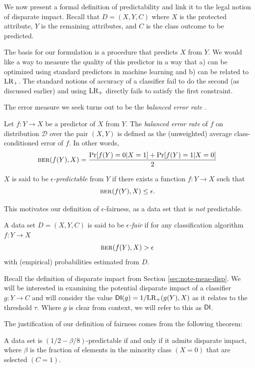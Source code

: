 We now present a formal definition of predictability and link it to the legal notion of disparate impact.  Recall that $D = (X,Y,C)$ where $X$ is the protected attribute, $Y$ is the remaining attributes, and $C$ is the class outcome to be predicted.

The basis for our formulation is a procedure that predicts $X$ from $Y$. We would like a way to measure the quality of this predictor in a way that a) can be optimized using standard predictors in machine learning and b) can be related to $\text{LR}_+$. The standard notions of accuracy of a classifier fail to do the second (as discussed earlier) and using $\text{LR}_+$ directly fails to satisfy the first constraint. 

The error measure we seek turns out to be the \emph{balanced error rate} \ber. 

\begin{defn}[BER]
  Let $f : Y \to X$ be a predictor of $X$ from $Y$. The \emph{balanced error rate} \ber of $f$ on distribution $\mathcal{D}$ over the pair $(X, Y)$ is defined as the (unweighted) average class-conditioned error of $f$. In other words, 
\[ \text{\textsc{ber}}(f(Y), X) = \frac{\Pr[f(Y) = 0 | X = 1] + \Pr[f(Y) = 1 | X = 0] }{2} \]
\end{defn}

\begin{defn}
$X$ is said to be \emph{$\epsilon$-predictable} from $Y$ if there exists a function $f:Y \rightarrow X$ such that
\[\text{\textsc{ber}}(f(Y), X) \le\epsilon. \]
\end{defn}

This motivates our definition of $\epsilon$-fairness, as a data set that is \emph{not} predictable.
\begin{defn}
A data set $D = (X, Y, C)$ is said to be \emph{$\epsilon$-fair} if for any
classification algorithm $f \colon Y \to X$ 
\[\text{\textsc{ber}}(f(Y), X) > \epsilon \]
with (empirical) probabilities estimated from $D$.
\end{defn}

Recall the definition of disparate impact from Section \ref{sec:note-meas-disp}.  We will be interested in examining the potential disparate impact of a classifier $g \colon Y \rightarrow C$ and will consider the value $\mathsf{DI}(g) = 1 / \text{LR}_+(g(Y), X)$ as it relates to the threshold $\tau$.  Where $g$ is clear from context, we will refer to this as $\mathsf{DI}$.

The justification of our definition of fairness comes from the following theorem:
\begin{theorem}
\label{sec:conn-pred-disp-1}
A data set is $(1/2-\beta/8)$-predictable if and only if it admits disparate impact, where $\beta$ is the fraction of elements in the minority class $(X = 0)$ that are selected $(C = 1)$. 
\end{theorem}


